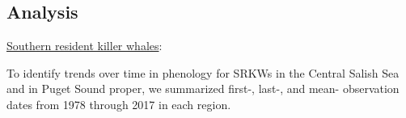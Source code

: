 \documentclass{article}
\begin{document}
\subsection* {Analysis}
\underline{Southern resident killer whales}:
\par To identify trends over time in phenology for SRKWs in the Central Salish Sea and in Puget Sound proper, we summarized first-, last-, and mean- observation dates from 1978 through 2017 in each region. %
\end{document}
